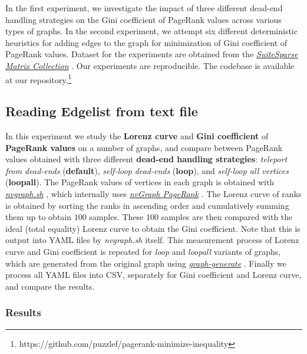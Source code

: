 In the first experiment, we investigate the impact of three different dead-end handling strategies on the Gini coefficient of PageRank values across various types of graphs. In the second experiment, we attempt six different deterministic heuristics for adding edges to the graph for minimization of Gini coefficient of PageRank values. Dataset for the experiments are obtained from the \href{https://sparse.tamu.edu}{\textit{SuiteSparse Matrix Collection}} \cite{suite19}. Our experiments are reproducible. The codebase is available at our repository.\footnote{https://github.com/puzzlef/pagerank-minimize-inequality}




\subsection{Reading Edgelist from text file}

In this experiment we study the \textbf{Lorenz curve} and \textbf{Gini coefficient} of \textbf{PageRank values} on a number of graphs, and compare between PageRank values obtained with three different \textbf{dead-end handling strategies}: \textit{teleport from dead-ends} (\textbf{default}), \textit{self-loop dead-ends} (\textbf{loop}), and \textit{self-loop all vertices} (\textbf{loopall}). The PageRank values of vertices in each graph is obtained with \href{https://www.npmjs.com/package/nvgraph.sh}{\textit{nvgraph.sh}} \cite{sahu2021nvgraph}, which internally uses \href{https://docs.nvidia.com/cuda/archive/10.0/nvgraph/index.html#nvgraph-pagerank-example}{\textit{nvGraph PageRank}} \cite{nvidia2018nvgraph}. The Lorenz curve of ranks is obtained by sorting the ranks in ascending order and cumulatively summing them up to obtain $100$ samples. These $100$ samples are then compared with the ideal (total equality) Lorenz curve to obtain the Gini coefficient. Note that this is output into YAML files by \textit{nvgraph.sh} itself. This measurement process of Lorenz curve and Gini coefficient is repeated for \textit{loop} and \textit{loopall} variants of graphs, which are generated from the original graph using \href{https://github.com/puzzlef/graph-generate}{\textit{graph-generate}} \cite{sahu2022github}. Finally we process all YAML files into CSV, separately for Gini coefficient and Lorenz curve, and compare the results.







\subsubsection{Results}

